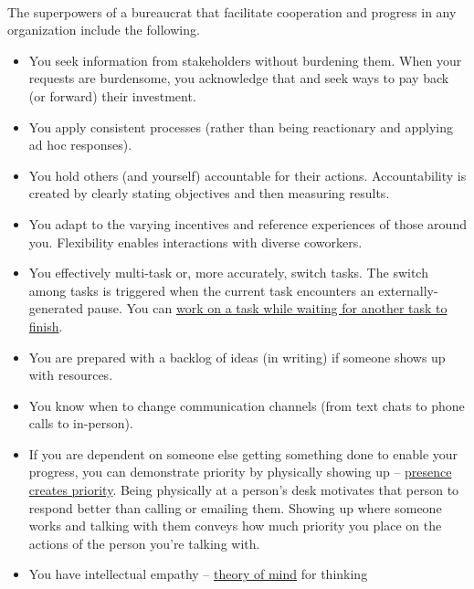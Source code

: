 \ \\

The superpowers of a bureaucrat that facilitate cooperation and progress in any organization include the following.
\begin{itemize}
\item You seek information from stakeholders without burdening them. When your requests are burdensome, you acknowledge that and seek ways to pay back (or forward) their investment.
\item You apply consistent processes (rather than being reactionary and applying ad hoc responses).
\item You hold others (and yourself) accountable for their actions. Accountability is created by clearly stating objectives and then measuring results.
\item You adapt to the varying incentives and reference experiences of those around you. Flexibility enables interactions with diverse coworkers. 
    \item You effectively multi-task or, more accurately, switch tasks. The switch among tasks is triggered when the current task encounters an externally-generated pause. You can \href{https://en.wikipedia.org/wiki/Pipeline_(computing)\%23Concept_and_motivation}{work on a task while waiting for another task to finish}. 
\iftoggle{WPinmargin}{\marginpar{$>$Wikipedia: pipeline (computing)}}{}
    \item You are prepared with a backlog of ideas (in writing) if someone shows up with resources.
    \item You know when to change communication channels (from text chats to phone calls to in-person). 
    \item If you are dependent on someone else getting something done to enable your progress, you can demonstrate priority by physically showing up -- \underline{presence creates priority}. 
    Being physically at a person's desk motivates that person to respond better than calling  or emailing them. Showing up where someone works and talking with them conveys how much priority you place on the actions of the person you're talking with.
    \item You have intellectual empathy -- \href{https://en.wikipedia.org/wiki/Theory_of_mind}{theory of mind} for thinking 

\end{itemize}
